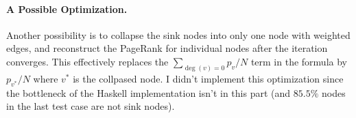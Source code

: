\documentclass{article}
\begin{document}
\paragraph{A Possible Optimization.} Another possibility is to collapse the
sink nodes into only one node with weighted edges, and reconstruct the PageRank
for individual nodes after the iteration converges. This effectively replaces
the $\sum_{\deg(v)=0} p_v/N$ term in the formula by $p_{v^*}/N$ where $v^*$ is
the collpased node. I didn't implement this optimization since the bottleneck
of the Haskell implementation isn't in this part (and $85.5\%$ nodes in the
last test case are not sink nodes).
\end{document}
